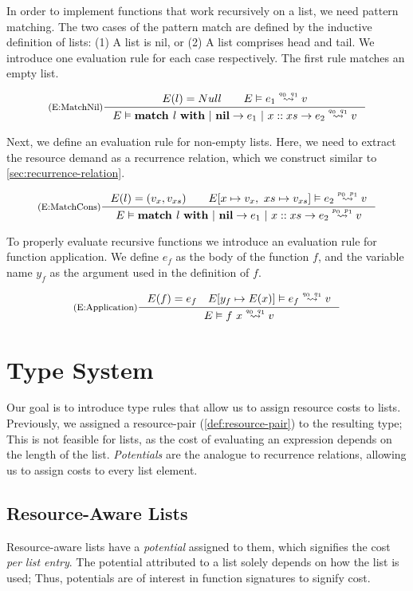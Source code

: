 In order to implement functions that work recursively on a list, we need pattern matching. The two cases of the pattern match are defined by the inductive definition of lists: (1) A list is nil, or (2) A list comprises head and tail. We introduce one evaluation rule for each case respectively. The first rule matches an empty list.

\[
   \inference[(E:MatchNil)]
   {E(l) = Null \qquad \evals{E}{e_1}{v}{q_0}{q_1}}
   {\evals{E}{\listmatch{l}{e_1}{e_2}}{v}{q_0}{q_1}}
\]

Next, we define an evaluation rule for non-empty lists. Here, we need to extract the resource demand as a recurrence relation, which we construct similar to \cref{sec:recurrence-relation}.

\[
   \inference[(E:MatchCons)]
   {E(l) = (v_x, v_{xs}) \qquad \evals{E[x \mapsto v_x,~xs \mapsto v_{xs}]}{e_2}{v}{p_0}{p_1}} 
   {\evals{E}{\listmatch{l}{e_1}{e_2}}{v}{p_0}{p_1}}
\]

To properly evaluate recursive functions we introduce an evaluation rule for function application. We define \(e_f\) as the body of the function \(f\), and the variable name \(y_f\) as the argument used in the definition of \(f\). 

\[
   \inference[(E:Application)]
   {E(f) = e_f 
   \quad 
   \evals{E[y_f \mapsto E(x)]}{e_f}{v}{q_0}{q_1}}
   {\evals{E}{f~x}{v}{q_0}{q_1}}
\]

\section{Type System}

Our goal is to introduce type rules that allow us to assign resource costs to lists. Previously, we assigned a resource-pair (\cref{def:resource-pair}) to the resulting type; This is not feasible for lists, as the cost of evaluating an expression depends on the length of the list. \emph{Potentials} are the analogue to recurrence relations, allowing us to assign costs to every list element. 

\subsection{Resource-Aware Lists}\label{sec:resource-aware-lists}

Resource-aware lists have a \emph{potential} assigned to them, which signifies the cost \emph{per list entry}. The potential attributed to a list solely depends on how the list is used; Thus, potentials are of interest in function signatures to signify cost. 

